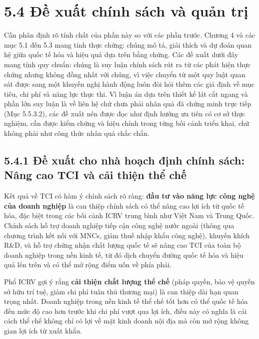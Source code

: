 \documentclass[
  a4paper,
  13pt]{extreport}
\begin{document}
\hypertarget{ux111ux1ec1-xuux1ea5t-chuxednh-suxe1ch-vuxe0-quux1ea3n-trux1ecb}{%
\section{5.4 Đề xuất chính sách và quản
trị}\label{ux111ux1ec1-xuux1ea5t-chuxednh-suxe1ch-vuxe0-quux1ea3n-trux1ecb}}

Cần phân định rõ tính chất của phần này so với các phần trước. Chương 4
và các mục 5.1 đến 5.3 mang tính thực chứng: chúng mô tả, giải thích và
dự đoán quan hệ giữa quốc tế hóa và hiệu quả dựa trên bằng chứng. Các đề
xuất dưới đây mang tính quy chuẩn: chúng là suy luận chính sách rút ra
từ các phát hiện thực chứng nhưng không đồng nhất với chúng, vì việc
chuyển từ một quy luật quan sát được sang một khuyến nghị hành động luôn
đòi hỏi thêm các giả định về mục tiêu, chi phí và năng lực thực thi. Vì
luận án dựa trên thiết kế lát cắt ngang và phần lớn suy luận là về liên
hệ chứ chưa phải nhân quả đã chứng minh trực tiếp (Mục 5.5.3.2), các đề
xuất nên được đọc như định hướng ưu tiên có cơ sở thực nghiệm, cần được
kiểm chứng và hiệu chỉnh trong từng bối cảnh triển khai, chứ không phải
như công thức nhân quả chắc chắn.

\hypertarget{ux111ux1ec1-xuux1ea5t-cho-nhuxe0-houx1ea1ch-ux111ux1ecbnh-chuxednh-suxe1ch-nuxe2ng-cao-tci-vuxe0-cux1ea3i-thiux1ec7n-thux1ec3-chux1ebf}{%
\subsection{5.4.1 Đề xuất cho nhà hoạch định chính sách: Nâng cao TCI và
cải thiện thể
chế}\label{ux111ux1ec1-xuux1ea5t-cho-nhuxe0-houx1ea1ch-ux111ux1ecbnh-chuxednh-suxe1ch-nuxe2ng-cao-tci-vuxe0-cux1ea3i-thiux1ec7n-thux1ec3-chux1ebf}}

Kết quả về TCI có hàm ý chính sách rõ ràng: \textbf{đầu tư vào năng lực
công nghệ của doanh nghiệp} là can thiệp chính sách có thể nâng cao lợi
ích từ quốc tế hóa, đặc biệt trong các bối cảnh ICRV trung bình như Việt
Nam và Trung Quốc. Chính sách hỗ trợ doanh nghiệp tiếp cận công nghệ
nước ngoài (thông qua chương trình kết nối với MNCs, giảm thuế nhập khẩu
công nghệ), khuyến khích R\&D, và hỗ trợ chứng nhận chất lượng quốc tế
sẽ nâng cao TCI của toàn bộ doanh nghiệp trong nền kinh tế, từ đó dịch
chuyển đường quốc tế hóa và hiệu quả lên trên và có thể mở rộng điểm uốn
về phía phải.

Phổ ICRV gợi ý rằng \textbf{cải thiện chất lượng thể chế} (pháp quyền,
bảo vệ quyền sở hữu trí tuệ, giảm chi phí tuân thủ thương mại) là can
thiệp dài hạn quan trọng nhất. Doanh nghiệp trong nền kinh tế thể chế
tốt hơn có thể quốc tế hóa đến mức độ cao hơn trước khi chi phí vượt qua
lợi ích, điều này có nghĩa là cải cách thể chế không chỉ có lợi về mặt
kinh doanh nội địa mà còn mở rộng không gian lợi ích từ xuất khẩu.
\end{document}
